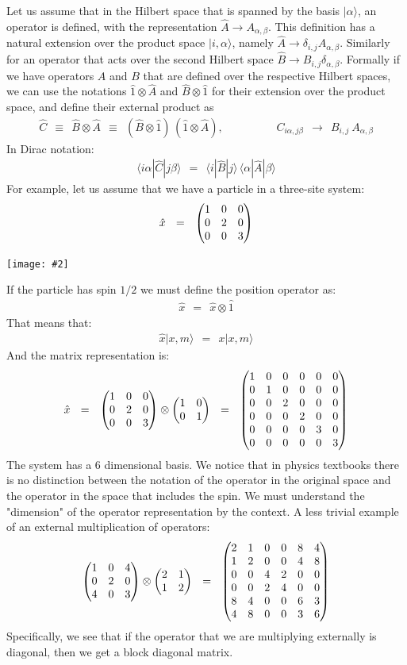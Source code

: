 \documentclass[onecolumn,fleqn, 11pt]{revtex4}
\newcommand{\amatrix}[1]{\begin{matrix} #1 \end{matrix}}
\newcommand{\putgraph}[2][0.30\hsize]{\texttt{[image: \#2]}}
\newcommand{\beq}{\begin{eqnarray}}
\newcommand{\eeq}{\end{eqnarray}}
\begin{document}
Let us assume that in the Hilbert space 
that is spanned by the basis ${|\alpha\rangle}$, 
an operator is defined, with the representation ${\hat{A} \rightarrow A_{\alpha,\beta}}$. 
This definition has a natural extension over the 
product space ${|i,\alpha\rangle}$, 
namely ${\hat{A} \rightarrow \delta_{i,j} A_{\alpha,\beta}}$.
Similarly for an operator that acts over 
the second Hilbert space ${\hat{B} \rightarrow B_{i,j} \delta_{\alpha,\beta}}$.
Formally if we have operators $A$ and $B$ that are defined 
over the respective Hilbert spaces, 
we can use the notations $\hat{1} \otimes \hat{A}$ 
and  $\hat{B} \otimes \hat{1}$ for their extension over the 
product space, and define their external product as 
\beq
\hat{C} \ \ \equiv \ \ \hat{B} \otimes \hat{A} 
\ \ \equiv \ \ (\hat{B} \otimes \hat{1}) \, (\hat{1} \otimes \hat{A}),
\hspace{2cm}
C_{i\alpha,j\beta} \ \ \rightarrow \ \ B_{i,j} \ A_{\alpha,\beta} 
\eeq
In Dirac notation:
\beq
\langle i\alpha | \hat{C} | j \beta\rangle \ \ = \ \ \langle i | \hat{B} |j \rangle \, \langle \alpha | \hat{A} | \beta \rangle 
\eeq
For example, let us assume that we have 
a particle in a three-site system:
\beq
\hat{x} \ \ = \ \ \left(\amatrix{1&0&0\cr 0&2&0\cr 0&0&3}\right) 
\eeq


\begin{center}
\putgraph{OpenThreeSiteSystem}
\end{center}


If the particle has spin $1/2$ we must define the position operator as:
\beq
\hat{x} \ \ = \ \ \hat{x}\otimes \hat{ 1} 
\eeq
That means that:
\beq
\hat{x} |x,m \rangle \ \ = \ \  x | x, m \rangle 
\eeq
And the matrix representation is:
\beq
\hat{x} \ \ = \ \ \left(\amatrix{1&0&0\cr 0&2&0\cr 0&0&3}\right) \otimes \left( \amatrix{1&0\cr 0&1} \right) 
\ \ = \ \ \left(\amatrix{1&0&0&0&0&0\cr 0&1&0&0&0&0\cr 0&0&2&0&0&0\cr 0&0&0&2&0&0\cr 0&0&0&0&3&0 \cr 0&0&0&0&0&3 }\right) 
\eeq
The system has a 6 dimensional basis. We notice 
that in physics textbooks there is no distinction 
between the notation of the operator in the original 
space and the operator in the space that includes 
the spin. We must understand the "dimension" of the 
operator representation by the context. A less trivial 
example of an external multiplication of operators:
\beq
\left(\amatrix{1&0&4\cr 0&2&0\cr 4&0&3}\right) \otimes \left(\amatrix{2&1\cr 1&2}\right) 
\ \ = \ \ \left(\amatrix{2&1&0&0&8&4\cr 1&2&0&0&4&8\cr 0&0&4&2&0&0\cr 0&0&2&4&0&0\cr 8&4&0&0&6&3 \cr 4&8&0&0&3&6} \right) 
\eeq
Specifically, we see that if the operator 
that we are multiplying externally is diagonal, 
then we get a block diagonal matrix. 
\end{document}
